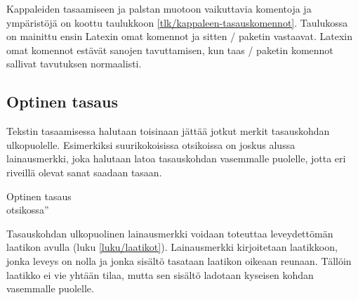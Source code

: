 
Kappaleiden tasaamiseen ja palstan muotoon vaikuttavia komentoja ja
ympäristöjä on koottu taulukkoon \ref{tlk/kappaleen-tasauskomennot}.
Taulukossa on mainittu ensin Latexin omat komennot ja sitten
\-/ paketin vastaavat. Latexin omat komennot
estävät sanojen tavuttamisen, kun taas \-/ paketin
komennot sallivat tavutuksen normaalisti.

\subsection{Optinen tasaus}

Tekstin tasaamisessa halutaan toisinaan jättää jotkut merkit
tasauskohdan ulkopuolelle. Esimerkiksi suurikokoisissa otsikoissa on
joskus alussa lainausmerkki, joka halutaan latoa tasauskohdan vasemmalle
puolelle, jotta eri riveillä olevat sanat saadaan tasaan.

\begin{tulossis}
  \Large{}Optinen tasaus \\
  otsikossa''
\end{tulossis}

\noindent
Tasauskohdan ulkopuolinen lainausmerkki voidaan toteuttaa leveydettömän
laatikon avulla (luku \ref{luku/laatikot}). Lainausmerkki kirjoitetaan
laatikkoon, jonka leveys on nolla ja jonka sisältö tasataan laatikon
oikeaan reunaan. Tällöin laatikko ei vie yhtään tilaa, mutta sen sisältö
ladotaan kyseisen kohdan vasemmalle puolelle.

